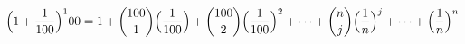 \documentclass[preview]{standalone}
\begin{document}
\begin{align*}
\Big( 1 + {1 \over 100}\Big)^100 = 1 + {100 \choose 1} \Big( {1 \over 100} \Big) + {100 \choose 2} \Big( {1 \over 100} \Big)^2 + \cdots + {n \choose j} \Big( {1 \over n} \Big)^j + \cdots + \Big( {1 \over n} \Big)^n
\end{align*}
\end{document}
